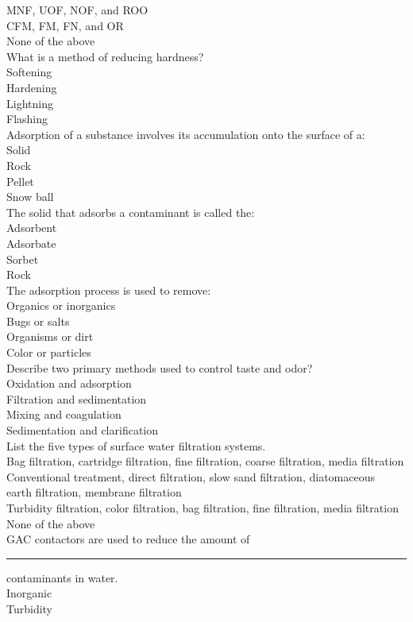 MNF, UOF, NOF, and ROO\\
CFM, FM, FN, and OR\\
None of the above\\
What is a method of reducing hardness?\\
Softening\\
Hardening\\
Lightning\\
Flashing\\
Adsorption of a substance involves its accumulation onto the surface of a:\\
Solid\\
Rock\\
Pellet\\
Snow ball\\
The solid that adsorbs a contaminant is called the:\\
Adsorbent\\
Adsorbate\\
Sorbet\\
Rock\\
The adsorption process is used to remove:\\
Organics or inorganics\\
Bugs or salts\\
Organisms or dirt\\
Color or particles\\
Describe two primary methods used to control taste and odor?\\
Oxidation and adsorption\\
Filtration and sedimentation\\
Mixing and coagulation\\
Sedimentation and clarification\\
List the five types of surface water filtration systems.\\
Bag filtration, cartridge filtration, fine filtration, coarse filtration, media filtration\\
Conventional treatment, direct filtration, slow sand filtration, diatomaceous\\
earth filtration, membrane filtration\\
Turbidity filtration, color filtration, bag filtration, fine filtration, media filtration\\
None of the above\\
GAC contactors are used to reduce the amount of \rule{1cm}{0.5pt}  contaminants in water.\\
Inorganic\\
Turbidity\\
